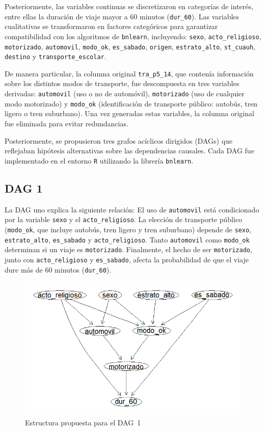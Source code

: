 \documentclass[eng]{ajceam-class}
\begin{document}
Posteriormente, las variables continuas se discretizaron en categorías de interés, entre ellas la duración de viaje mayor a 60 minutos (\texttt{dur\_60}). Las variables cualitativas se transformaron en factores categóricos para garantizar compatibilidad con los algoritmos de \texttt{bnlearn}\cite{scutari_bnlearn}, incluyendo: \texttt{sexo}, \texttt{acto\_religioso}, \texttt{motorizado}, \texttt{automovil}, \texttt{modo\_ok}, \texttt{es\_sabado}, \texttt{origen}, \texttt{estrato\_alto}, \texttt{st\_cuauh}, \texttt{destino} y \texttt{transporte\_escolar}.

De manera particular, la columna original \texttt{tra\_p5\_14}, que contenía información sobre los distintos modos de transporte, fue descompuesta en tres variables derivadas: \texttt{automovil} (uso o no de automóvil), \texttt{motorizado} (uso de cualquier modo motorizado) y \texttt{modo\_ok} (identificación de transporte público: autobús, tren ligero o tren suburbano). Una vez generadas estas variables, la columna original fue eliminada para evitar redundancias.

Posteriormente, se propusieron tres grafos acíclicos dirigidos (DAGs) que reflejaban hipótesis alternativas sobre las dependencias causales. Cada DAG fue implementado en el entorno \texttt{R} utilizando la librería \texttt{bnlearn}.


\subsection{DAG 1}

La DAG uno explica la siguiente relación: 
El uso de \texttt{automovil} está condicionado por la variable \texttt{sexo} y el \texttt{acto\_religioso}. 
La elección de transporte público (\texttt{modo\_ok}, que incluye autobús, tren ligero y tren suburbano) 
depende de \texttt{sexo}, \texttt{estrato\_alto}, \texttt{es\_sabado} y \texttt{acto\_religioso}. 
Tanto \texttt{automovil} como \texttt{modo\_ok} determinan si un viaje es \texttt{motorizado}. 
Finalmente, el hecho de ser \texttt{motorizado}, junto con \texttt{acto\_religioso} y \texttt{es\_sabado}, 
afecta la probabilidad de que el viaje dure más de 60 minutos (\texttt{dur\_60}).

\begin{figure}[H] 
 \centering
 \includegraphics[width=0.8\columnwidth]{dag1} 
 \caption{Estructura propuesta para el DAG~1} \label{fig:dag1}
\end{figure}
\end{document}
